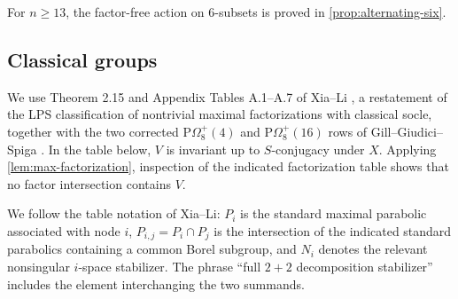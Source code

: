 \documentclass[11pt]{amsart}
\theoremstyle{definition}
\begin{document}
For \(n\ge13\), the factor-free action on 6-subsets is proved in
\cref{prop:alternating-six}.
\subsection{Classical groups}\label{app:classical}

We use Theorem 2.15 and Appendix Tables A.1--A.7 of Xia--Li
\cite{xiali-solvable}, a restatement of the LPS classification of
nontrivial maximal factorizations with classical socle, together with the
two corrected \(\mathrm P\Omega_8^+(4)\) and
\(\mathrm P\Omega_8^+(16)\) rows of Gill--Giudici--Spiga
\cite[Section 2]{ggs-szep}.  In the table below,
\(V\) is invariant up to \(S\)-conjugacy under \(X\).  Applying
\cref{lem:max-factorization}, inspection of the indicated factorization table
shows that no factor intersection contains \(V\).

We follow the table notation of Xia--Li: \(P_i\) is the standard maximal
parabolic associated with node \(i\), \(P_{i,j}=P_i\cap P_j\) is the
intersection of the indicated standard parabolics containing a common
Borel subgroup, and \(N_i\) denotes the relevant nonsingular \(i\)-space
stabilizer.  The phrase ``full \(2+2\) decomposition stabilizer'' includes
the element interchanging the two summands.
\end{document}
